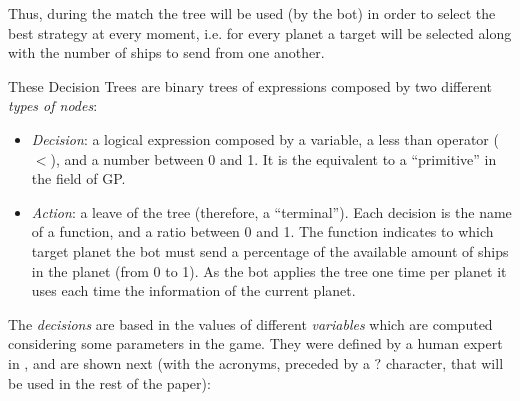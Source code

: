 \documentclass[conference]{IEEEtran}
\begin{document}
Thus, during the match the tree will be used (by the bot) in order to select the best strategy at every moment, i.e. for every planet a target will be selected along with the number of ships to send from one another.

These Decision Trees are binary trees of expressions composed by
two different \textit{types of nodes}:

\begin{itemize}
\item {\em Decision}: a logical expression composed by a variable, a less than operator ($<$), and a number between 0 and 1. It is the equivalent to a ``primitive'' in the field of GP.
\item {\em Action}: a leave of the tree (therefore, a ``terminal''). Each decision is the name of a function, and a ratio between 0 and 1. The function indicates to which target planet the bot must send a percentage of the available amount of ships in the planet (from 0 to 1). As the bot applies the tree one time per planet it uses each time the information of the current planet.

\end{itemize}

The \textit{decisions} are based in the values of different \textit{variables} which are computed considering some parameters in the game. They were defined by a human expert in \cite{GarciaGP14}, and are shown next (with the acronyms, preceded by a $?$ character, that will be used in the rest of the paper):
\end{document}
